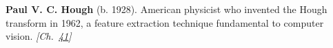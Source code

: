 \textbf{Paul V. C. Hough} (b. 1928). American physicist who invented the Hough transform in 1962, a feature extraction technique fundamental to computer vision. \emph{[Ch.~\hyperref[ch:hough]{41}]}

